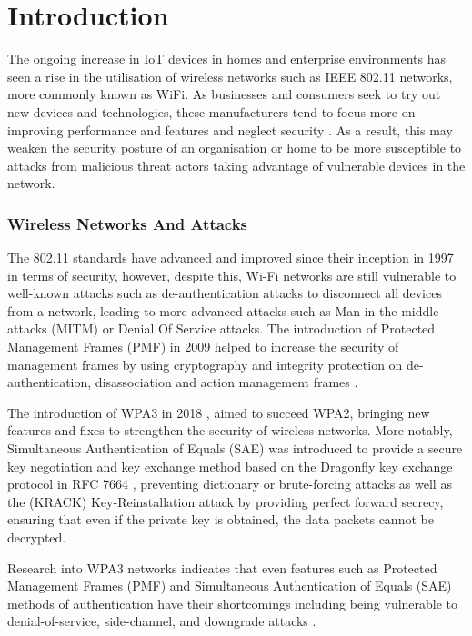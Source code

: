 
\section{Introduction}
\label{sec:Introduction} 

The ongoing increase in IoT devices in homes and enterprise environments has seen a rise in the utilisation of wireless networks such as IEEE 802.11 networks, more commonly known as WiFi. As businesses and consumers seek to try out new devices and technologies, these manufacturers tend to focus more on improving performance and features and neglect security \parencite{roundy_iot_nodate}. As a result, this may weaken the security posture of an organisation or home to be more susceptible to attacks from malicious threat actors taking advantage of vulnerable devices in the network.




\subsubsection{Wireless Networks And Attacks}
\smallskip

The 802.11 standards have advanced and improved since their inception in 1997 in terms of security, however, despite this, Wi-Fi networks are still vulnerable to well-known attacks such as de-authentication attacks to disconnect all devices from a network, leading to more advanced attacks such as Man-in-the-middle attacks (MITM) or Denial Of Service attacks. The introduction of Protected Management Frames (PMF) in 2009 \parencite{5278657} helped to increase the security of management frames by using cryptography and integrity protection on de-authentication, disassociation and action management frames \parencite{9249426}. 

The introduction of WPA3 in 2018 \parencite{wifialliance_2022_wpa3}, aimed to succeed WPA2, bringing new features and fixes to strengthen the security of wireless networks. More notably, Simultaneous Authentication of Equals (SAE) was introduced to provide a secure key negotiation and key exchange method based on the Dragonfly key exchange protocol in RFC 7664 \parencite{rfc7664}, preventing dictionary or brute-forcing attacks as well as the (KRACK) Key-Reinstallation attack \parencite{krack} by providing perfect forward secrecy, ensuring that even if the private key is obtained, the data packets cannot be decrypted. 

Research into WPA3 networks indicates that even features such as Protected Management Frames (PMF) and Simultaneous Authentication of Equals (SAE) methods of authentication have their shortcomings including being vulnerable to denial-of-service, side-channel, and downgrade attacks \parencite{vanhoef-sp2020-dragonblood}.


